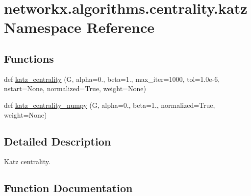 \hypertarget{namespacenetworkx_1_1algorithms_1_1centrality_1_1katz}{}\section{networkx.\+algorithms.\+centrality.\+katz Namespace Reference}
\label{namespacenetworkx_1_1algorithms_1_1centrality_1_1katz}
\subsection*{Functions}
\begin{DoxyCompactItemize}
\item 
def \hyperlink{namespacenetworkx_1_1algorithms_1_1centrality_1_1katz_a9ca17809d265c245d8158372b05c9bf5}{katz\+\_\+centrality} (G, alpha=0., beta=1., max\+\_\+iter=1000, tol=1.\+0e-\/6, nstart=\+None, normalized=\+True, weight=\+None)
\item 
def \hyperlink{namespacenetworkx_1_1algorithms_1_1centrality_1_1katz_a6b99ac114367ee092b67536f778f33a0}{katz\+\_\+centrality\+\_\+numpy} (G, alpha=0., beta=1., normalized=True, weight=None)
\end{DoxyCompactItemize}


\subsection{Detailed Description}
\begin{DoxyVerb}Katz centrality.\end{DoxyVerb}
 

\subsection{Function Documentation}
\mbox{\label{namespacenetworkx_1_1algorithms_1_1centrality_1_1katz_a9ca17809d265c245d8158372b05c9bf5}} 
